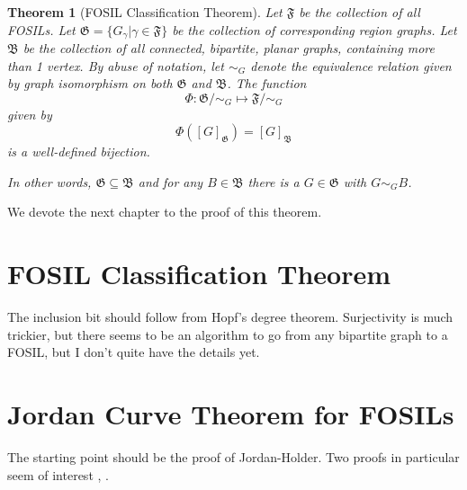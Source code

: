 \documentclass{article}
\theoremstyle{definition}
\theoremstyle{definition}
\theoremstyle{plain}
\newtheorem{theorem}{Theorem}
\begin{document}
\begin{theorem}[FOSIL Classification Theorem]

Let $\mathfrak{F}$ be the collection of all FOSILs. Let $\mathfrak{G}=\{G_{\gamma} | \gamma \in \mathfrak{F}\}$ be the collection of corresponding region graphs. Let $\mathfrak{B}$ be the collection of all connected, bipartite, planar graphs, containing more than 1 vertex. By abuse of notation, let $\sim_{G}$ denote the equivalence relation given by graph isomorphism on both $\mathfrak{G}$ and $\mathfrak{B}$. The function $$\Phi : \mathfrak{G}/\sim_{G} \mapsto \mathfrak{F}/\sim_{G}$$ given by $$\Phi([G]_{\mathfrak{G}}) = [G]_{\mathfrak{B}}$$ is a well-defined bijection.

In other words, $\mathfrak{G} \subseteq \mathfrak{B}$ and for any $B \in \mathfrak{B}$ there is a $G \in \mathfrak{G}$ with $G \sim_{G} B$.
\end{theorem}
We devote the next chapter to the proof of this theorem.

\section{FOSIL Classification Theorem}

The inclusion bit should follow from Hopf's degree theorem. Surjectivity is much trickier, but there seems to be an algorithm to go from any bipartite graph to a FOSIL, but I don't quite have the details yet.

\section{Jordan Curve Theorem for FOSILs}

The starting point should be the proof of Jordan-Holder. Two proofs in particular seem of interest \cite{hales07}, \cite{thomassen92}.



\end{document}

